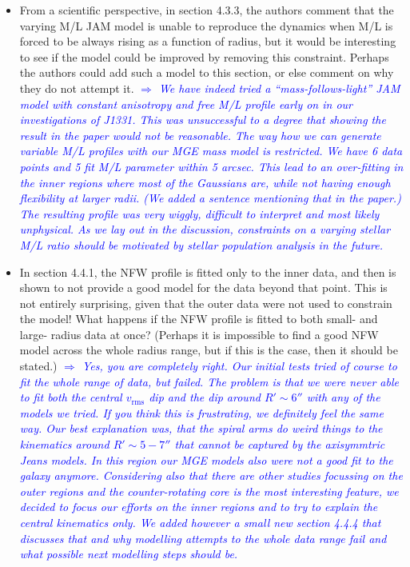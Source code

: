 \documentclass[10pt,a4paper]{article}
\newcommand{\Comment}[1]{\textsl{\textcolor{Blue}{$\Longrightarrow$ {#1}}}}
\begin{document}
\begin{itemize}
\item From a scientific perspective, in section 4.3.3, the authors comment that the
varying M/L JAM model is unable to reproduce the dynamics when M/L is forced to be
always rising as a function of radius, but it would be interesting to see if the
model could be improved by removing this constraint. Perhaps the authors could add
such a model to this section, or else comment on why they do not attempt it. \Comment{We have indeed tried a ``mass-follows-light'' JAM model with constant anisotropy and free M/L profile early on in our investigations of J1331. This was unsuccessful to a degree that showing the result in the paper would not be reasonable.  The way how we can generate variable M/L profiles with our MGE mass model is restricted. We have 6 data points and 5 fit M/L parameter within 5 arcsec. This lead to an over-fitting in the inner regions where most of the Gaussians are, while not having enough flexibility at larger radii. (We added a sentence mentioning that in the paper.) The resulting profile was very wiggly, difficult to interpret and most likely unphysical.  As we lay out in the discussion, constraints on a varying stellar M/L ratio should be motivated by stellar population analysis in the future.}

\item In section 4.4.1, the NFW profile is fitted only to the inner data, and then is
shown to not provide a good model for the data beyond that point. This is not
entirely surprising, given that the outer data were not used to constrain the model!
What happens if the NFW profile is fitted to both small- and large- radius data at
once? (Perhaps it is impossible to find a good NFW model across the whole radius
range, but if this is the case, then it should be stated.) \Comment{Yes, you are completely right. Our initial tests tried of course to fit the whole range of data, but failed. The problem is that we were never able to fit both the central $v_\text{rms}$ dip and the dip around $R'\sim 6''$ with any of the models we tried. If you think this is frustrating, we definitely feel the same way. Our best explanation was, that the spiral arms do weird things to the kinematics around $R'\sim 5-7''$ that cannot be captured by the axisymmtric Jeans models. In this region our MGE models also were not a good fit to the galaxy anymore. Considering also that there are other studies focussing on the outer regions and the counter-rotating core is the most interesting feature, we decided to focus our efforts on the inner regions and to try to explain the central kinematics only. We added however a small new section 4.4.4 that discusses that and why modelling attempts to the whole data range fail and what possible next modelling steps should be.}


\end{itemize}
\end{document}
